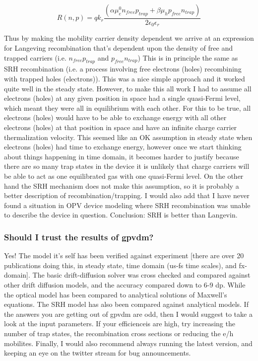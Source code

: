 \begin{equation}
R(n,p)=q k_{r}\frac{(\alpha \mu_e^0 n_{free} p_{trap}+\beta \mu_h p_{free} n_{trap}) }{2\epsilon_0\epsilon_r}
\end{equation}

Thus by making the mobility carrier density dependent we arrive at an expression for Langeving recombination that's dependent upon the density of free and trapped carriers (i.e. $n_{free} p_{trap}$ and $ p_{free} n_{trap}$) This is in principle the same as SRH recombination (i.e. a process involving free electrons (holes) recombining with trapped holes (electrons)).  This was a nice simple approach and it worked quite well in the steady state.  However, to make this all work I had to assume all electrons (holes) at any given position in space had a single quasi-Fermi level, which meant they were all in equilibrium with each other.  For this to be true, all electrons (holes) would have to be able to exchange energy with all other electrons (holes) at that position in space and have an infinite charge carrier thermalization velocity.  This seemed like an OK assumption in steady state when electrons (holes) had time to exchange energy, however once we start thinking about things happening in time domain, it becomes harder to justify because there are so many trap states in the device it is unlikely that charge carriers will be able to act as one equilibrated gas with one quasi-Fermi level.  On the other hand the SRH mechanism does not make this assumption, so it is probably a better description of recombination/trapping.  I would also add that I have never found a situation in OPV device modeling where SRH recombination was unable to describe the device in question.  Conclusion: SRH is better than Langevin.  


\subsubsection{Should I trust the results of gpvdm?}
Yes!  The model it's self has been verified against experiment [there are over 20 publications doing this, in steady state, time domain (us-fs time scales), and fx-domain]. The basic drift-diffusion solver was cross checked and compared against other drift diffusion models, and the accuracy compared down to 6-9 dp.  While the optical model has been compared to analytical solutions of Maxwell's equations.  The SRH model has also been compared against analytical models.  If the answers you are getting out of gpvdm are odd, then I would suggest to take a look at the input parameters.  If your efficienceis are high, try increasing the number of trap states, the recombination cross sections or reducing the e/h mobilites.  Finally, I would also recommend always running the latest version, and keeping an eye on the twitter stream for bug announcements.



